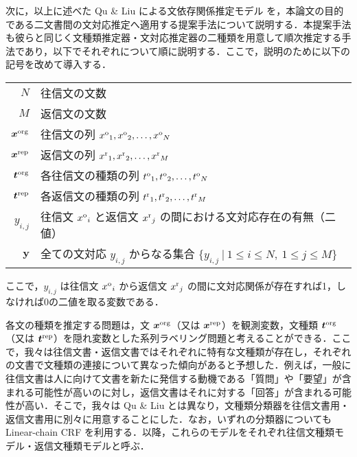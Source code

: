 \documentclass[japanese]{jnlp_1.4}
\begin{document}
次に，以上に述べた Qu \& Liu による文依存関係推定モデル \cite{Zhonghua2012} を，本論文の目的である二文書間の文対応推定へ適用する提案手法について説明する．本提案手法も彼らと同じく文種類推定器・文対応推定器の二種類を用意して順次推定する手法であり，以下でそれぞれについて順に説明する．ここで，説明のために以下の記号を改めて導入する．

\vspace{0.25zh}
\begin{tabular}{rl}
$N$                    & 往信文の文数 \\
$M$                    & 返信文の文数 \\
$\bm{x}^{\rm org}$     & 往信文の列 ${x^{\rm o}}_1, {x^{\rm o}}_2, \dots, {x^{\rm o}}_N$ \\
$\bm{x}^{\rm rep}$     & 返信文の列 ${x^{\rm r}}_1, {x^{\rm r}}_2, \dots, {x^{\rm r}}_M$ \\
$\bm{t}^{\rm org}$     & 各往信文の種類の列 ${t^{\rm o}}_1, {t^{\rm o}}_2, \dots, {t^{\rm o}}_N$ \\
$\bm{t}^{\rm rep}$     & 各返信文の種類の列 ${t^{\rm r}}_1, {t^{\rm r}}_2, \dots, {t^{\rm r}}_M$ \\
$y_{i,j}$              & 往信文 ${x^{\rm o}}_i$ と返信文 ${x^{\rm r}}_j$ の間における文対応存在の有無（二値） \\
$\bm{y}$               & 全ての文対応 $y_{i,j}$ からなる集合 $\{ y_{i,j} ~|~ 1 \leq i \leq N,~ 1 \leq j \leq M \}$ \\
\end{tabular}
\vspace{0.25zh}

\noindent
ここで，$y_{i,j}$ は往信文 ${x^{\rm o}}_i$ から返信文 ${x^{\rm r}}_j$ の間に文対応関係が存在すれば1，しなければ0の二値を取る変数である．

各文の種類を推定する問題は，文 $\bm{x}^{\rm org}$（又は $\bm{x}^{\rm rep}$）を観測変数，文種類 $\bm{t}^{\rm org}$（又は $\bm{t}^{\rm rep}$）を隠れ変数とした系列ラベリング問題と考えることができる．ここで，我々は往信文書・返信文書ではそれぞれに特有な文種類が存在し，それぞれの文書で文種類の連接について異なった傾向があると予想した．例えば，一般に往信文書は人に向けて文書を新たに発信する動機である「質問」や「要望」が含まれる可能性が高いのに対し，返信文書はそれに対する「回答」が含まれる可能性が高い．そこで，我々は Qu \& Liu とは異なり，文種類分類器を往信文書用・返信文書用に別々に用意することにした．なお，いずれの分類器についても Linear-chain CRF \cite{Lafferty2001} を利用する．以降，これらのモデルをそれぞれ往信文種類モデル・返信文種類モデルと呼ぶ．
\end{document}
